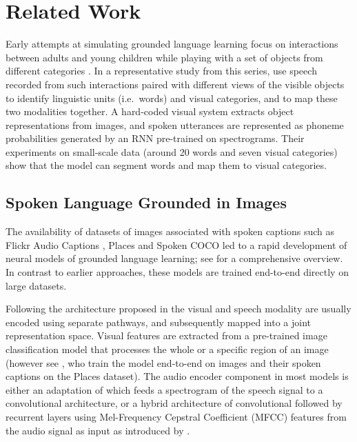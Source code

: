 \section{Related Work}
\label{sec:related}

Early attempts at simulating grounded language learning focus on
interactions between adults and young children while playing with a
set of objects from different categories \cite{roy1999learning,roy2002learning,
  gorniak2003visually,mukherjee2003visual}. In a representative study
from this series, \citet{roypentland2002learning} use speech recorded from
such interactions paired with different views of the visible objects
to identify linguistic units (i.e.\ words) and visual categories, and
to map these two modalities together. A hard-coded visual system
extracts object representations from images, and spoken utterances are
represented as phoneme probabilities generated by an RNN pre-trained on
spectrograms.  Their experiments on small-scale data (around 20 words
and seven visual categories) show that the model can segment words and
map them to visual categories.

\subsection{Spoken Language Grounded in Images}
\label{sec:images}
The availability of datasets of images associated with spoken captions
such as Flickr Audio Captions \cite{harwath2015deep}, Places
\cite{zhou2014learning} and Spoken COCO \cite{hsu2019transfer} led to
a rapid development of neural models of grounded language learning; see
\citet{chrupala-visually-2021} for a comprehensive overview. In contrast to 
earlier approaches, these models are trained end-to-end directly on
large datasets.

Following the architecture proposed in \citet{karpathy2014deep} the visual and 
speech modality are usually encoded using separate pathways, and subsequently 
mapped into a joint representation space.
Visual features are extracted from a pre-trained
image classification model that processes the whole or a specific
region of an image (however see \citet{harwath2018jointly}, who train the
model end-to-end on images and their spoken captions on the Places
dataset). The audio encoder component in most models is 
either an adaptation of \citet{harwath2016unsupervised} which feeds a
spectrogram of the speech signal to a convolutional architecture, or a
hybrid architecture of convolutional followed by recurrent layers using
Mel-Frequency Cepstral Coefficient (MFCC) features from the audio
signal as input as introduced by \citet{chrupala-etal-2017-representations}.

